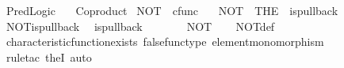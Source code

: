 %
\begin{isabellebody}%
%
%
\isadelimdocument
%
\endisadelimdocument
%
\isatagdocument
%
\isamarkuptrue%
%
\endisatagdocument
{\isafolddocument}%
%
\isadelimdocument
%
\endisadelimdocument
%
\isadelimtheory
%
\endisadelimtheory
%
\isatagtheory
{}\isamarkupfalse%
\ Pred{\isacharunderscore}{\kern0pt}Logic\isanewline
\ \ \ Coproduct\isanewline
{}%
\endisatagtheory
{\isafoldtheory}%
%
\isadelimtheory
%
\endisadelimtheory
%
\isadelimdocument
%
\endisadelimdocument
%
\isatagdocument
%
\isamarkuptrue%
%
\endisatagdocument
{\isafolddocument}%
%
\isadelimdocument
%
\endisadelimdocument
{}\isamarkupfalse%
\ NOT\ {\isacharcolon}{\kern0pt}{\isacharcolon}{\kern0pt}\ {\isachardoublequoteopen}cfunc{\isachardoublequoteclose}\ \isanewline
\ \ {\isachardoublequoteopen}NOT\ {\isacharequal}{\kern0pt}\ {\isacharparenleft}{\kern0pt}THE\ {\isasymchi}{\isachardot}{\kern0pt}\ is{\isacharunderscore}{\kern0pt}pullback\ {\isasymone}\ {\isasymone}\ {\isasymOmega}\ {\isasymOmega}\ {\isacharparenleft}{\kern0pt}{\isasymbeta}\isactrlbsub {\isasymone}\isactrlesub {\isacharparenright}{\kern0pt}\ {\isasymt}\ {\isasymf}\ {\isasymchi}{\isacharparenright}{\kern0pt}{\isachardoublequoteclose}\isanewline
\isanewline
{}\isamarkupfalse%
\ NOT{\isacharunderscore}{\kern0pt}is{\isacharunderscore}{\kern0pt}pullback{\isacharcolon}{\kern0pt}\isanewline
\ \ {\isachardoublequoteopen}is{\isacharunderscore}{\kern0pt}pullback\ {\isasymone}\ {\isasymone}\ {\isasymOmega}\ {\isasymOmega}\ {\isacharparenleft}{\kern0pt}{\isasymbeta}\isactrlbsub {\isasymone}\isactrlesub {\isacharparenright}{\kern0pt}\ {\isasymt}\ {\isasymf}\ NOT{\isachardoublequoteclose}\isanewline
%
\isadelimproof
\ \ %
\endisadelimproof
%
\isatagproof
{}\isamarkupfalse%
\ NOT{\isacharunderscore}{\kern0pt}def\isanewline
\ \ \isamarkupfalse%
\ characteristic{\isacharunderscore}{\kern0pt}function{\isacharunderscore}{\kern0pt}exists\ false{\isacharunderscore}{\kern0pt}func{\isacharunderscore}{\kern0pt}type\ element{\isacharunderscore}{\kern0pt}monomorphism\isanewline
\ \ \isamarkupfalse%
\ {\isacharparenleft}{\kern0pt}rule{\isacharunderscore}{\kern0pt}tac\ the{}I{}{\isacharcomma}{\kern0pt}\ auto{\isacharparenright}{\kern0pt}%
\endisatagproof
{\isafoldproof}%
%
\isadelimproof
\isanewline
%
\endisadelimproof

\end{isabellebody}

